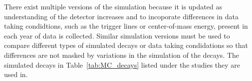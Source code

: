 There exist multiple versions of the simulation because it is updated as understanding of the detector increases and to incoporate differences in data taking condidtions, such as the trigger lines or center-of-mass energy, present in each year of data is collected. Similar simulation versions must be used to compare different types of simulated decays or data taking condidations so that differences are not masked by variations in the simulation of the decays. The simulated decays in Table~\ref{tab:MC_decays} listed under the studies they are used in. 



